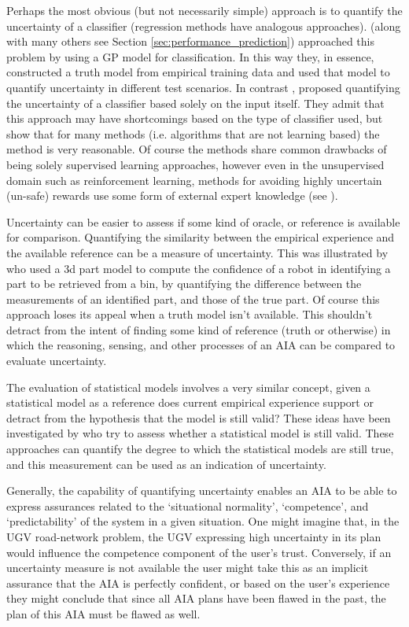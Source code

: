     Perhaps the most obvious (but not necessarily simple) approach is to quantify the uncertainty of a classifier (regression methods have analogous approaches). \citet{Gurau2016-hs} (along with many others see Section \ref{sec:performance_prediction}) approached this problem by using a GP model for classification. In this way they, in essence, constructed a truth model from empirical training data and used that model to quantify uncertainty in different test scenarios. In contrast , \cite{Zhang2014-he} proposed quantifying the uncertainty of a classifier based solely on the input itself. They admit that this approach may have shortcomings based on the type of classifier used, but show that for many methods (i.e. algorithms that are not learning based) the method is very reasonable. Of course the methods share common drawbacks of being solely supervised learning approaches, however even in the unsupervised domain such as reinforcement learning, methods for avoiding highly uncertain (un-safe) rewards use some form of external expert knowledge (see \cite{Garcia2015-rs, Lipton2016-dq}).

    Uncertainty can be easier to assess if some kind of oracle, or reference is available for comparison. Quantifying the similarity between the empirical experience and the available reference can be a measure of uncertainty. This was illustrated by \cite{Kaipa2015-hy} who used a 3d part model to compute the confidence of a robot in identifying a part to be retrieved from a bin, by quantifying the difference between the measurements of an identified part, and those of the true part. Of course this approach loses its appeal when a truth model isn't available. This shouldn't detract from the intent of finding some kind of reference (truth or otherwise) in which the reasoning, sensing, and other processes of an AIA can be compared to evaluate uncertainty.

    The evaluation of statistical models involves a very similar concept, given a statistical model as a reference does current empirical experience support or detract from the hypothesis that the model is still valid? These ideas have been investigated by \cite{Laskey1991-mf, Laskey1995-jp, Laskey2015-gz, Zagorecki2015-qy, Habbema1976-xd, Ghosh2016-dl} who try to assess whether a statistical model is still valid. These approaches can quantify the degree to which the statistical models are still true, and this measurement can be used as an indication of uncertainty.

    Generally, the capability of quantifying uncertainty enables an AIA to be able to express assurances related to the `situational normality', `competence', and `predictability' of the system in a given situation. One might imagine that, in the UGV road-network problem, the UGV expressing high uncertainty in its plan would influence the competence component of the user's trust. Conversely, if an uncertainty measure is not available the user might take this as an implicit assurance that the AIA is perfectly confident, or based on the user's experience they might conclude that since all AIA plans have been flawed in the past, the plan of this AIA must be flawed as well.

